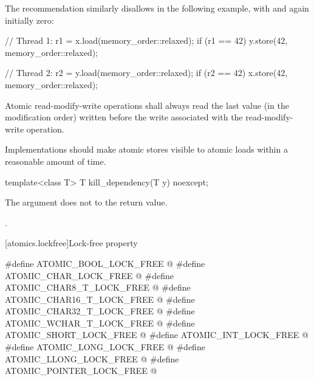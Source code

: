 \pnum
\begin{note}
The recommendation similarly disallows  in the
following example, with  and  again initially zero:

\begin{codeblock}
// Thread 1:
r1 = x.load(memory_order::relaxed);
if (r1 == 42) y.store(42, memory_order::relaxed);
\end{codeblock}

\begin{codeblock}
// Thread 2:
r2 = y.load(memory_order::relaxed);
if (r2 == 42) x.store(42, memory_order::relaxed);
\end{codeblock}
\end{note}

\pnum
Atomic read-modify-write operations shall always read the last value
(in the modification order) written before the write associated with
the read-modify-write operation.

\pnum
Implementations should make atomic stores visible to atomic loads within a reasonable
amount of time.

\begin{indexed}{}
\begin{itemdecl}
template<class T>
  T kill_dependency(T y) noexcept;
\end{itemdecl}
\end{indexed}

\begin{itemdescr}
\pnum
\effects
The argument does not
to the return value.

\pnum
\returns
{}.
\end{itemdescr}


[atomics.lockfree]{Lock-free property}

%
%
%
%
%
%
%
%
%
%
%
\begin{codeblock}
#define ATOMIC_BOOL_LOCK_FREE @\unspec@
#define ATOMIC_CHAR_LOCK_FREE @\unspec@
#define ATOMIC_CHAR8_T_LOCK_FREE @\unspec@
#define ATOMIC_CHAR16_T_LOCK_FREE @\unspec@
#define ATOMIC_CHAR32_T_LOCK_FREE @\unspec@
#define ATOMIC_WCHAR_T_LOCK_FREE @\unspec@
#define ATOMIC_SHORT_LOCK_FREE @\unspec@
#define ATOMIC_INT_LOCK_FREE @\unspec@
#define ATOMIC_LONG_LOCK_FREE @\unspec@
#define ATOMIC_LLONG_LOCK_FREE @\unspec@
#define ATOMIC_POINTER_LOCK_FREE @\unspec@
\end{codeblock}

